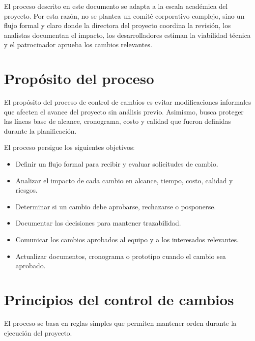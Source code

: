 \documentclass[11pt,spanish]{article}
\begin{document}
El proceso descrito en este documento se adapta a la escala académica del proyecto. Por esta razón, no se plantea un comité corporativo complejo, sino un flujo formal y claro donde la directora del proyecto coordina la revisión, los analistas documentan el impacto, los desarrolladores estiman la viabilidad técnica y el patrocinador aprueba los cambios relevantes.

\section{Propósito del proceso}

El propósito del proceso de control de cambios es evitar modificaciones informales que afecten el avance del proyecto sin análisis previo. Asimismo, busca proteger las líneas base de alcance, cronograma, costo y calidad que fueron definidas durante la planificación.

El proceso persigue los siguientes objetivos:

\begin{itemize}[leftmargin=*, label={\textbullet}]
    \item Definir un flujo formal para recibir y evaluar solicitudes de cambio.
    \item Analizar el impacto de cada cambio en alcance, tiempo, costo, calidad y riesgos.
    \item Determinar si un cambio debe aprobarse, rechazarse o posponerse.
    \item Documentar las decisiones para mantener trazabilidad.
    \item Comunicar los cambios aprobados al equipo y a los interesados relevantes.
    \item Actualizar documentos, cronograma o prototipo cuando el cambio sea aprobado.
\end{itemize}

\section{Principios del control de cambios}

El proceso se basa en reglas simples que permiten mantener orden durante la ejecución del proyecto.
\end{document}
